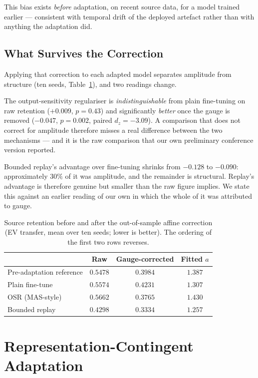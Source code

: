 \documentclass[journal]{IEEEtran}
\begin{document}
This bias exists \emph{before} adaptation, on recent source data, for a model
trained earlier --- consistent with temporal drift of the deployed artefact
rather than with anything the adaptation did.

\subsection{What Survives the Correction}
\label{sec:gauge}
Applying that correction to each adapted model separates amplitude from
structure (ten seeds, Table~\ref{tab:gauge}), and two readings change.

The output-sensitivity regulariser is \emph{indistinguishable} from plain
fine-tuning on raw retention ($+0.009$, $p{=}0.43$) and significantly
\emph{better} once the gauge is removed ($-0.047$, $p{=}0.002$, paired
$d_z{=}-3.09$). A comparison that does not correct for amplitude therefore
misses a real difference between the two mechanisms --- and it is the raw
comparison that our own preliminary conference version reported.

Bounded replay's advantage over fine-tuning shrinks from $-0.128$ to $-0.090$:
approximately $30\%$ of it was amplitude, and the remainder is structural.
Replay's advantage is therefore genuine but smaller than the raw figure
implies. We state this against an earlier reading of our own in which the whole
of it was attributed to gauge.

\begin{table}[t]
\centering
\caption{Source retention before and after the out-of-sample affine
correction (EV transfer, mean over ten seeds; lower is better). The ordering
of the first two rows reverses.}
\label{tab:gauge}
\begin{tabular}{@{}lccc@{}}
\toprule
& Raw & Gauge-corrected & Fitted $a$ \\
\midrule
Pre-adaptation reference & $0.5478$ & $0.3984$ & $1.387$ \\
\midrule
Plain fine-tune & $0.5574$ & $0.4231$ & $1.307$ \\
OSR (MAS-style) & $0.5662$ & $\mathbf{0.3765}$ & $1.430$ \\
Bounded replay & $\mathbf{0.4298}$ & $0.3334$ & $1.257$ \\
\bottomrule
\end{tabular}
\end{table}

\section{Representation-Contingent Adaptation}
\label{sec:repr}
\end{document}
